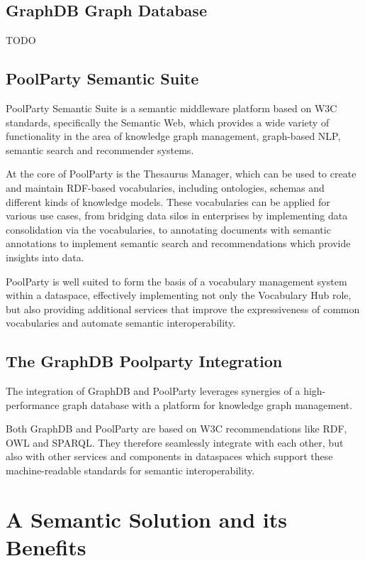 \documentclass[manuscript,screen]{acmart}
\begin{document}
\subsection{GraphDB Graph Database}\label{graphdb-graph-database}

TODO

\subsection{PoolParty Semantic Suite}\label{poolparty-semantic-suite}

PoolParty Semantic Suite is a semantic middleware platform based on W3C
standards, specifically the Semantic Web, which provides a wide variety
of functionality in the area of knowledge graph management, graph-based
NLP, semantic search and recommender systems.

At the core of PoolParty is the Thesaurus Manager, which can be used to
create and maintain RDF-based vocabularies, including ontologies,
schemas and different kinds of knowledge models. These vocabularies can
be applied for various use cases, from bridging data silos in
enterprises by implementing data consolidation via the vocabularies, to
annotating documents with semantic annotations to implement semantic
search and recommendations which provide insights into data.

PoolParty is well suited to form the basis of a vocabulary management
system within a dataspace, effectively implementing not only the
Vocabulary Hub role, but also providing additional services that improve
the expressiveness of common vocabularies and automate semantic
interoperability.

\subsection{The GraphDB Poolparty
Integration}\label{the-graphdb-poolparty-integration}

The integration of GraphDB and PoolParty leverages synergies of a
high-performance graph database with a platform for knowledge graph
management.

Both GraphDB and PoolParty are based on W3C recommendations like RDF,
OWL and SPARQL. They therefore seamlessly integrate with each other, but
also with other services and components in dataspaces which support
these machine-readable standards for semantic interoperability.

\section{A Semantic Solution and its
Benefits}\label{a-semantic-solution-and-its-benefits}
\end{document}
